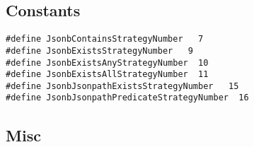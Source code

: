\documentclass[
]{article}
\begin{document}
\hypertarget{constants}{%
\subsection{Constants}\label{constants}}

\begin{verbatim}
#define JsonbContainsStrategyNumber   7
#define JsonbExistsStrategyNumber   9
#define JsonbExistsAnyStrategyNumber  10
#define JsonbExistsAllStrategyNumber  11
#define JsonbJsonpathExistsStrategyNumber   15
#define JsonbJsonpathPredicateStrategyNumber  16
\end{verbatim}

\hypertarget{misc}{%
\subsection{Misc}\label{misc}}
\end{document}
